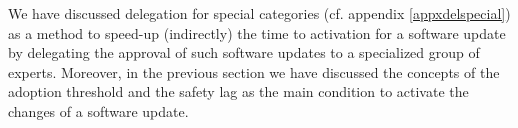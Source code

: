 We have discussed delegation for special categories (cf. appendix \ref{appxdelspecial}) as a method to speed-up (indirectly) the time to activation for a software update by delegating the approval of such software updates to a specialized group of experts. Moreover, in the previous section we have discussed the concepts of the adoption threshold and the safety lag as the main condition to activate the changes of a software update.




